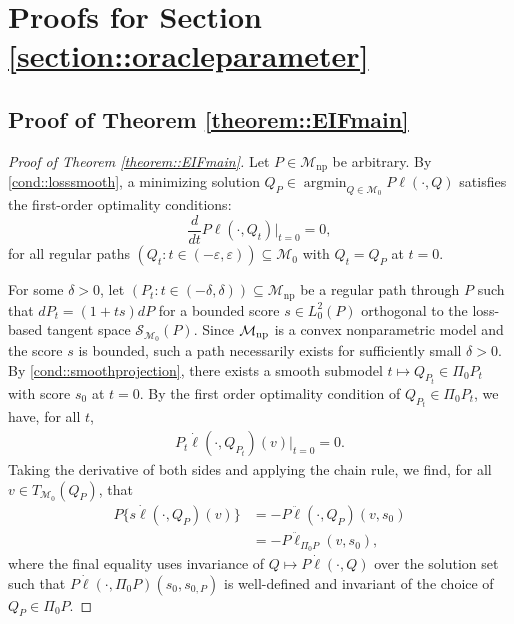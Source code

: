 \documentclass[11pt]{article}
\DeclareMathOperator*{\argmin}{argmin}
\theoremstyle{definition}
\begin{document}
 
 

  
 
 

\section{Proofs for Section \ref{section::oracleparameter}}

 
 \subsection{Proof of Theorem \ref{theorem::EIFmain}}
 


\begin{proof}[Proof of Theorem \ref{theorem::EIFmain}]

 
  

Let $P \in \mathcal{M}_{\mathrm{np}}$ be arbitrary.  By  \ref{cond::losssmooth}, a minimizing solution $Q_P \in  \argmin_{Q \in \mathcal{M}_0} P \ell (\cdot, Q)$ satisfies the first-order optimality conditions:
$$ \frac{d}{dt} P  \ell(\cdot, Q_t)   \big|_{t=0} = 0,$$
for all regular paths $(Q_t: t \in (-\varepsilon, \varepsilon)) \subseteq \mathcal{M}_0$ with $Q_t = Q_P$ at $t=0$. 


For some $\delta > 0$, let $(P_t : t \in (-\delta, \delta)) \subseteq \mathcal{M}_{\mathrm{np}}$ be a regular path through $P$ such that $dP_t = (1+ ts) dP$ for a bounded score $s \in L^2_0(P)$ orthogonal to the loss-based tangent space $\mathcal{S}_{\mathcal{M}_0}(P)$. Since ${\cal M}_{\mathrm{np}}$ is a convex nonparametric model and the score $s$ is bounded, such a path necessarily exists for sufficiently small $\delta > 0$. By \ref{cond::smoothprojection}, there exists a smooth submodel $t \mapsto Q_{P_t} \in \Pi_0 P_t$ with score $s_{0}$ at $t = 0$. By the first order optimality condition of $Q_{P_t} \in \Pi_0 P_t$, we have, for all $t$,
\begin{align*}
 P_t  \dot{\ell}(\cdot, Q_{P_t})(v)   \big|_{t=0} =  0.
\end{align*}
Taking the derivative of both sides and applying the chain rule, we find, for all $v \in T_{\mathcal{M}_0}(Q_P)$, that
\begin{align}
 P \{s \dot{\ell}(\cdot, Q_{P})(v)\}   &=  - P \ddot{\ell}(\cdot, Q_{P})(v, s_0) \nonumber\\ 
  &=  - P \ddot{\ell}_{\Pi_0 P}(v, s_0), \label{eqn::pathwiseofloss}
\end{align}
where the final equality uses invariance of $Q \mapsto P \dot{\ell}(\cdot, Q) $ over the solution set such that $P \dot{\ell}(\cdot, \Pi_0 P)(s_{0}, s_{0,P})$ is well-defined and invariant of the choice of $Q_P \in \Pi_0 P$.


\end{proof}
\end{document}
